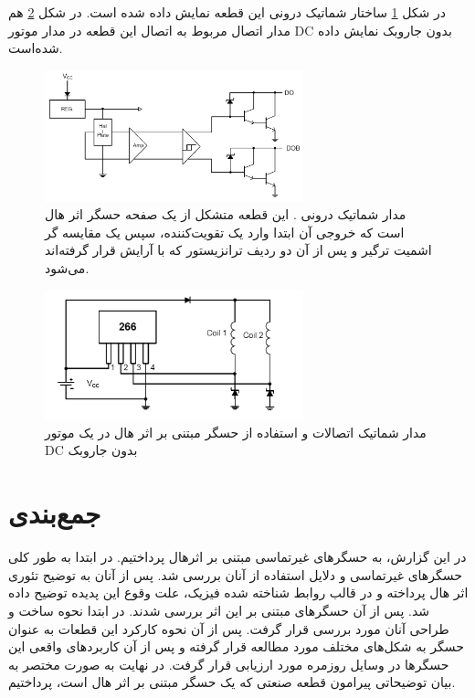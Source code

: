 \documentclass[conference]{IEEEtran-ModifiedForMVIP}
\begin{document}
در شکل \ref{fig:8} ساختار شماتیک درونی این قطعه نمایش داده شده است. در شکل \ref{fig:9} هم مدار اتصال مربوط به اتصال این قطعه در مدار موتور DC بدون جاروبک نمایش‌ داده شده‌است. 

\begin{figure}[t]
	
	\centering 
	\includegraphics[width=75mm]{Images/8.png}
	\caption{مدار شماتیک درونی . این قطعه متشکل از یک صفحه حسگر اثر هال است که خروجی آن ابتدا وارد یک تقویت‌کننده، سپس یک مقایسه گر اشمیت ترگیر و پس از آن دو ردیف ترانزیستور
		که با آرایش
		قرار گرفته‌اند می‌شود.
		\cite{ah266}	
	}\label{fig:8}
\end{figure}


\begin{figure}[t]
	
	\centering 
	\includegraphics[width=75mm]{Images/9.png}
	\caption{
		مدار شماتیک اتصالات و استفاده از حسگر مبتنی بر اثر هال  در یک موتور DC بدون جاروبک
		\cite{ah266}	
	}\label{fig:9}
\end{figure}



\section{جمع‌بندی}

در این گزارش، به حسگر‌های غیرتماسی مبتنی بر اثرهال پرداختیم. در ابتدا به طور کلی حسگرهای غیرتماسی و دلایل استفاده از آنان بررسی شد. پس از آنان به توضیح تئوری اثر هال پرداخته و در قالب روابط شناخته شده فیزیک، علت وقوع این پدیده توضیح داده شد.  پس از آن حسگرهای مبتنی بر این اثر بررسی شدند. در ابتدا نحوه ساخت و طراحی آنان مورد بررسی قرار گرفت.  پس از آن نحوه کارکرد این قطعات به عنوان حسگر به شکل‌های مختلف مورد مطالعه قرار گرفته و پس از آن کاربردهای واقعی این حسگرها در وسایل روزمره مورد ارزیابی قرار گرفت. در نهایت به صورت مختصر به بیان توضیحاتی پیرامون قطعه صنعتی  که یک حسگر مبتنی بر اثر هال است، پرداختیم.
\end{document}
